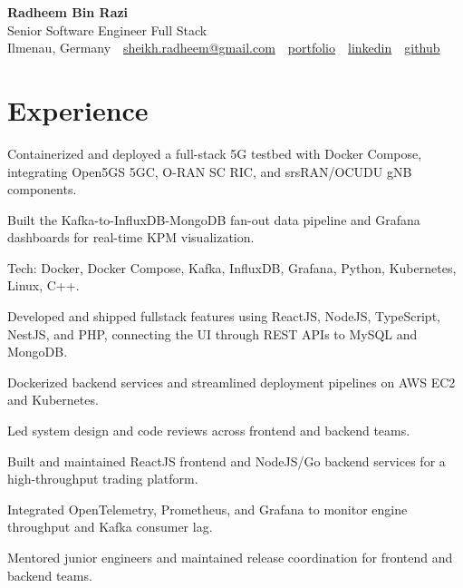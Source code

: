\documentclass[10pt,a4paper]{resume}
\makeatletter
\newcommand{\Portfolio}{https://radheem.github.io/my-cv}
\newcommand{\PortfolioText}{portfolio}
\newcommand{\GitHub}{https://github.com/radheem}
\newcommand{\LinkedIn}{https://www.linkedin.com/in/radheem-razi}
\newcommand{\Email}{sheikh.radheem@gmail.com}
\makeatother
\begin{document}
\begin{center}
  {\huge\bfseries Radheem Bin Razi}\\[3pt]
  {\large Senior Software Engineer Full Stack}\\[6pt]
  \small
  Ilmenau, Germany \,\textbar\,
  \href{mailto:\Email}{\Email} \,\textbar\,
  \href{\Portfolio}{\PortfolioText} \,\textbar\,
  \href{\LinkedIn}{linkedin} \,\textbar\,
  \href{\GitHub}{github}
\end{center}
\vspace{2pt}

\section{Experience}

\bullets
  \item Containerized and deployed a full-stack 5G testbed with Docker Compose, integrating Open5GS 5GC, O-RAN SC RIC, and srsRAN/OCUDU gNB components.
  \item Built the Kafka-to-InfluxDB-MongoDB fan-out data pipeline and Grafana dashboards for real-time KPM visualization.
  \item Tech: Docker, Docker Compose, Kafka, InfluxDB, Grafana, Python, Kubernetes, Linux, C++.
\bulletsend
\vspace{1.5pt}
\bullets
  \item Developed and shipped fullstack features using ReactJS, NodeJS, TypeScript, NestJS, and PHP, connecting the UI through REST APIs to MySQL and MongoDB.
  \item Dockerized backend services and streamlined deployment pipelines on AWS EC2 and Kubernetes.
  \item Led system design and code reviews across frontend and backend teams.
\bulletsend
\vspace{1.5pt}
\bullets
  \item Built and maintained ReactJS frontend and NodeJS/Go backend services for a high-throughput trading platform.
  \item Integrated OpenTelemetry, Prometheus, and Grafana to monitor engine throughput and Kafka consumer lag.
  \item Mentored junior engineers and maintained release coordination for frontend and backend teams.
\bulletsend
\vspace{1.5pt}
\end{document}
